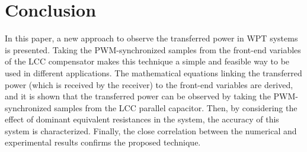 \documentclass[journal,a4paper]{IEEEtran}
\begin{document}
\section{Conclusion}
In this paper, a new approach to observe the transferred power in WPT systems is presented. Taking the PWM-synchronized samples from the front-end variables of the LCC compensator makes this technique a simple and feasible way to be used in different applications. The mathematical equations linking the transferred power (which is received by the receiver) to the front-end variables are derived, and it is shown that the transferred power can be observed by taking the PWM-synchronized samples from the LCC parallel capacitor. Then, by considering the effect of dominant equivalent resistances in the system, the accuracy of this system is characterized. Finally, the close correlation between the numerical and experimental results confirms the proposed technique.






%
\end{document}
